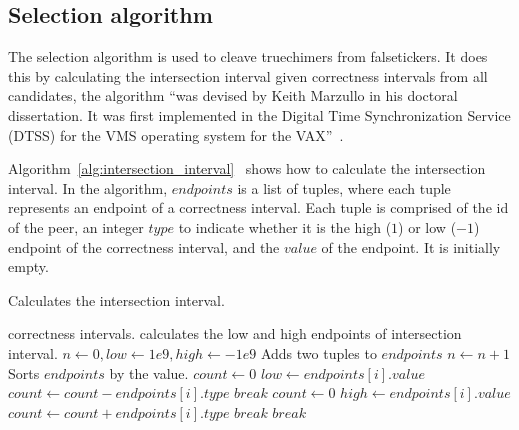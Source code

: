 \subsection{Selection algorithm}%
\label{sub:selection_algorithm}
The selection algorithm is used to cleave truechimers from falsetickers. It
does this by calculating the intersection interval given correctness intervals
from all candidates, the algorithm ``was devised by Keith Marzullo in his
doctoral dissertation.  It was first implemented in the Digital Time
Synchronization Service (DTSS) for the VMS operating system for the
VAX\null''~\cite{clock_selection}.

Algorithm~\ref{alg:intersection_interval}~\cite{source_code} shows how to
calculate the intersection interval.  In the algorithm, $endpoints$ is a list
of tuples, where each tuple represents an endpoint of a correctness interval.
Each tuple is comprised of the id of the peer, an integer $type$ to indicate
whether it is the high ($1$) or low ($-1$) endpoint of the correctness
interval, and the $value$ of the endpoint. It is initially empty.

\begin{algorithm}[!t]
    \centering
    \small
    \caption{Calculates the intersection interval.}
    \begin{algorithmic}[1]
        \REQUIRE
            correctness intervals.
        \ENSURE
            calculates the low and high endpoints of intersection interval.
        \STATE
        \STATE
            $n \leftarrow 0, low \leftarrow 1e9, high \leftarrow -1e9$
            \STATE
            Adds two tuples to $endpoints$
            \STATE
            $n \leftarrow n + 1$
        \ENDFOR
        \STATE
            Sorts $endpoints$ by the value.
        \STATE
        \STATE
            \STATE
            \STATE
            $count \leftarrow 0$
                \STATE
                $low \leftarrow endpoints[i].value$
                \STATE
                $count \leftarrow count - endpoints[i].type$
                \STATE
                    $break$
                \ENDIF
            \ENDFOR
            \STATE
            \STATE
            \STATE
            $count \leftarrow 0$
                \STATE
                $high \leftarrow endpoints[i].value$
                \STATE
                $count \leftarrow count + endpoints[i].type$
                    \STATE
                    $break$
                \ENDIF
            \ENDFOR
            \STATE
            \STATE
                \STATE
                $break$
            \ENDIF
        \ENDFOR
    \end{algorithmic}
\label{alg:intersection_interval}
\end{algorithm}

